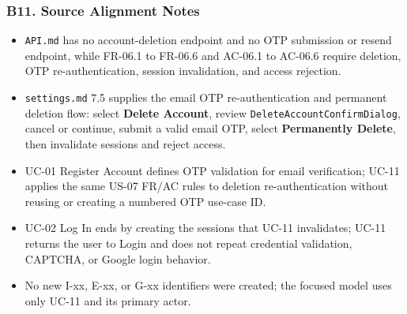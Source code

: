 \documentclass[12pt]{article}
\begin{document}
\par\medskip

\hypertarget{sec:b11-source-alignment-notes}{}
\subsubsection*{B11. Source Alignment Notes}
\par\medskip

\begin{itemize}
\item \texttt{API.md} has no account-deletion endpoint and no OTP submission or resend endpoint, while FR-06.1 to FR-06.6 and AC-06.1 to AC-06.6 require deletion, OTP re-authentication, session invalidation, and access rejection.
\item \texttt{settings.md} 7.5 supplies the email OTP re-authentication and permanent deletion flow: select \textbf{Delete Account}, review \texttt{DeleteAccountConfirmDialog}, cancel or continue, submit a valid email OTP, select \textbf{Permanently Delete}, then invalidate sessions and reject access.
\item UC-01 Register Account defines OTP validation for email verification; UC-11 applies the same US-07 FR/AC rules to deletion re-authentication without reusing or creating a numbered OTP use-case ID.
\item UC-02 Log In ends by creating the sessions that UC-11 invalidates; UC-11 returns the user to Login and does not repeat credential validation, CAPTCHA, or Google login behavior.
\item No new I-xx, E-xx, or G-xx identifiers were created; the focused model uses only UC-11 and its primary actor.
\end{itemize}
\par\medskip

\par\medskip
\hypertarget{sec:ui-prototype-specimens}{}
\end{document}
